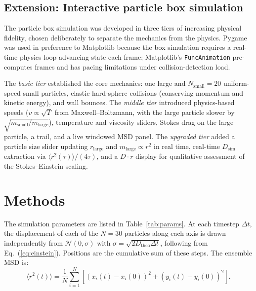 \documentclass[prb,twocolumn]{revtex4-1}
\begin{document}
\subsection{Extension: Interactive particle box simulation}

The particle box simulation was developed in three tiers of increasing physical fidelity, chosen deliberately to separate the mechanics from the physics. Pygame was used in preference to Matplotlib because the box simulation requires a real-time physics loop advancing state each frame; Matplotlib's \texttt{FuncAnimation} pre-computes frames and has pacing limitations under collision-detection load.

The \textit{basic tier} established the core mechanics: one large and $N_{\mathrm{small}} = 20$ uniform-speed small particles, elastic hard-sphere collisions (conserving momentum and kinetic energy), and wall bounces. The \textit{middle tier} introduced physics-based speeds ($v \propto \sqrt{T}$ from Maxwell--Boltzmann, with the large particle slower by $\sqrt{m_{\mathrm{small}}/m_{\mathrm{large}}}$), temperature and viscosity sliders, Stokes drag on the large particle, a trail, and a live windowed MSD panel. The \textit{upgraded tier} added a particle size slider updating $r_{\mathrm{large}}$ and $m_{\mathrm{large}} \propto r^2$ in real time, real-time $D_{\mathrm{sim}}$ extraction via $\langle r^2(\tau)\rangle/(4\tau)$, and a $D\cdot r$ display for qualitative assessment of the Stokes--Einstein scaling.

\section{Methods}
\label{sec:methods}

The simulation parameters are listed in Table~\ref{tab:params}. At each timestep $\Delta t$, the displacement of each of the $N = 30$ particles along each axis is drawn independently from $\mathcal{N}(0,\sigma)$ with $\sigma = \sqrt{2D_{\mathrm{theo}}\Delta t}$, following from Eq.~(\ref{eq:einstein}). Positions are the cumulative sum of these steps. The ensemble MSD is:
\begin{equation}
\langle r^2(t)\rangle = \frac{1}{N}\sum_{i=1}^{N}\left[(x_i(t)-x_i(0))^2 + (y_i(t)-y_i(0))^2\right].
\label{eq:ensmsd}
\end{equation}
\end{document}
